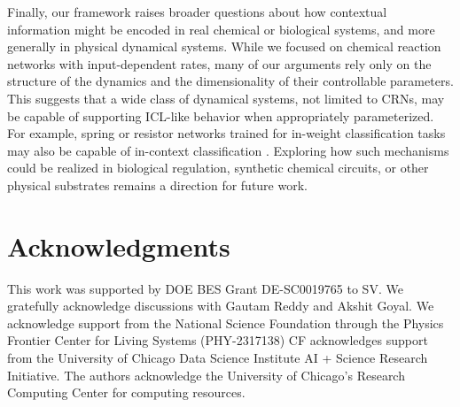 \documentclass[%
reprint,
superscriptaddress,
amsmath,amssymb,
aps,
]{revtex4-2}
\begin{document}
	Finally, our framework raises broader questions about how contextual information might be encoded in real chemical or biological systems, and more generally in physical dynamical systems. While we focused on chemical reaction networks with input-dependent rates, many of our arguments rely only on the structure of the dynamics and the dimensionality of their controllable parameters. This suggests that a wide class of dynamical systems, not limited to CRNs, may be capable of supporting ICL-like behavior when appropriately parameterized. For example, spring or resistor networks trained for in-weight classification tasks may also be capable of in-context classification \cite{stern2021supervised, stern2023learning}. Exploring how such mechanisms could be realized in biological regulation, synthetic chemical circuits, or other physical substrates remains a direction for future work.
	
	
	\section*{Acknowledgments}
	This work was supported by DOE BES Grant DE-SC0019765 to SV. We gratefully acknowledge discussions with Gautam Reddy and Akshit Goyal. 
	We acknowledge support from the National Science Foundation through the Physics Frontier Center for Living Systems (PHY-2317138)
	CF acknowledges support from the University of Chicago Data Science Institute AI + Science Research Initiative.  The authors acknowledge the University of Chicago’s Research Computing Center for computing resources. 
	
	
	
	
	
	\clearpage
	
	\appendix 
	
\end{document}
